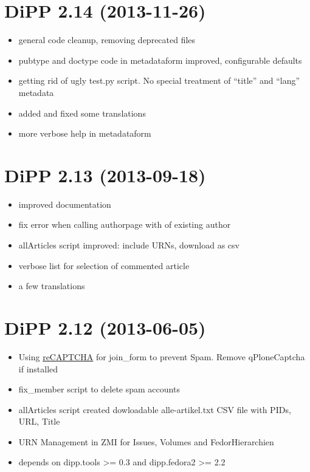 \documentclass[a4paper,10pt,ngerman]{sphinxmanual}
\begin{document}
\section{DiPP 2.14 (2013-11-26)}
\label{changelog:dipp-2-14-2013-11-26}\begin{itemize}
\item {} 
general code cleanup, removing deprecated files

\item {} 
pubtype and doctype code in metadataform improved, configurable defaults

\item {} 
getting rid of ugly test.py script. No special treatment of
``title'' and ``lang'' metadata

\item {} 
added and fixed some translations

\item {} 
more verbose help in metadataform

\end{itemize}


\section{DiPP 2.13 (2013-09-18)}
\label{changelog:dipp-2-13-2013-09-18}\begin{itemize}
\item {} 
improved documentation

\item {} 
fix error when calling authorpage with of existing author

\item {} 
allArticles script improved: include URNs, download as csv

\item {} 
verbose list for selection of commented article

\item {} 
a few translations

\end{itemize}


\section{DiPP 2.12 (2013-06-05)}
\label{changelog:dipp-2-12-2013-06-05}\begin{itemize}
\item {} 
Using \href{http://www.google.com/recaptcha}{reCAPTCHA}  for join\_form to prevent Spam.
Remove qPloneCaptcha if installed

\item {} 
fix\_member script to delete spam accounts

\item {} 
allArticles script created dowloadable alle-artikel.txt CSV file
with PIDs, URL, Title

\item {} 
URN Management in ZMI for Issues, Volumes and FedorHierarchien

\item {} 
depends on dipp.tools \textgreater{}= 0.3 and dipp.fedora2 \textgreater{}= 2.2

\end{itemize}
\end{document}
